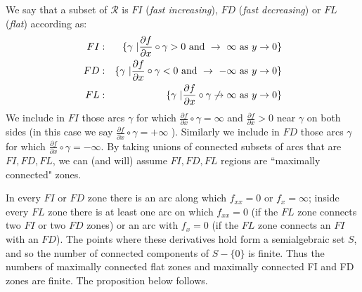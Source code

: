 \documentclass[article]{amsart}
\newcommand{\0}{{\bf 0}}
\begin{document}
We say that a subset of $\mathcal{R}$ is $FI$ ({\it fast increasing}), $FD$ ({\it fast decreasing}) or $FL$ ({\it flat}) according as:
\begin{eqnarray*}
FI &:& \{\gamma\ | \frac{\partial f}{\partial x} \circ\gamma > 0  
{\rm \ and}\ \rightarrow\ \infty\  {\rm as}\ y \rightarrow 0\}\\%
FD &:& \{ \gamma\ | \frac{\partial f}{\partial x} \circ\gamma < 0 
{\rm \ and}\ \rightarrow\ -\infty\  {\rm as} \ y \rightarrow 0\}\\%
FL &:& \{ \gamma\ | \frac{\partial f}{\partial x}\circ\gamma  \not\rightarrow \infty \ {\rm as}\ y \rightarrow 0\}
\end{eqnarray*}%
We include in $FI$ those arcs $\gamma$ for which $\frac{\partial f}{\partial x} \circ\gamma = \infty$ and $\frac{\partial f}{\partial x}  > 0$  near $\gamma$ on both sides (in this case we say  $\frac{\partial f}{\partial x} \circ\gamma = +\infty$ ). Similarly we include in $FD$ those arcs $\gamma$ for which $\frac{\partial f}{\partial x} \circ\gamma = -\infty$.
\noindent By taking unions of connected subsets of arcs that are $FI, FD, FL$, we can (and will) assume $FI, FD, FL$ regions are ``maximally connected" zones. 




In every $FI$ or $FD$ zone there is an arc
along which $f_{xx} =0$ or $f_x = \infty$; inside every $FL$ zone there is at
least one arc on which $f_{xx} =0$ (if the $FL$ zone connects two $FI$ or two $FD$
zones) or an arc with $f_x =0$ (if the $FL$ zone connects an $FI$ with an
$FD$).  The points where these derivatives hold form a semialgebraic set $S$,
and so the number of connected components  of $S-\{0\}$ is finite. Thus the numbers of maximally connected flat
zones and maximally connected FI and FD zones are finite.  The proposition below follows.
  
\end{document}
